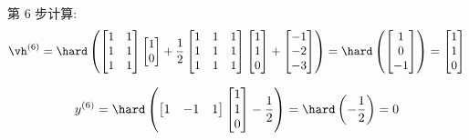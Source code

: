 \documentclass[openany]{ctexbook}
\theoremstyle{kaiti}
\theoremstyle{normal}
\begin{document}
第 6 步计算:
\begin{equation}
  \vh^{(6)}
  =\hard\left(
    \begin{bmatrix}
      1 & 1 \\
      1 & 1 \\
      1 & 1 \\
    \end{bmatrix}
    \begin{bmatrix}
      1 \\ 0 \\
    \end{bmatrix}
    +\frac{1}{2}
    \begin{bmatrix}
      1 & 1 & 1 \\
      1 & 1 & 1 \\
      1 & 1 & 1 \\
    \end{bmatrix}
    \begin{bmatrix}
      1 \\ 1 \\ 0 \\
    \end{bmatrix}
    +
    \begin{bmatrix}
      -1 \\ -2 \\ -3 \\
    \end{bmatrix}
  \right)
  =\hard\left(
    \begin{bmatrix}
      1 \\ 0 \\ -1 \\
    \end{bmatrix}
  \right)
  =
  \begin{bmatrix}
    1 \\ 1 \\ 0 \\
  \end{bmatrix}
\end{equation}

\begin{equation}
  y^{(6)}
  =\hard\left(
    \begin{bmatrix}
      1 & -1 & 1 \\
    \end{bmatrix}
    \begin{bmatrix}
      1 \\ 1 \\ 0 \\
    \end{bmatrix}
    -\frac{1}{2}
  \right)
  =\hard\left(
    -\frac{1}{2}
  \right)
  =0
\end{equation}
\end{document}

